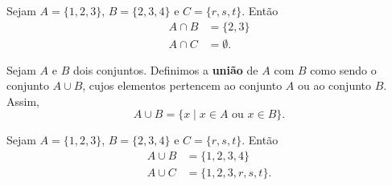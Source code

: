 \begin{exemplo}
	Sejam $A = \{1, 2, 3\}$, $B = \{2, 3, 4\}$ e $C = \{r, s, t\}$. Ent\~ao
	\begin{align*}
		A \cap B &= \{2, 3\}\\
		A \cap C &= \emptyset.
	\end{align*}
\end{exemplo}

\begin{definicao}\label{unicao_conjuntos}
	Sejam $A$ e $B$ dois conjuntos. Definimos a \textbf{uni{\~a}o} de $A$ com $B$ como sendo o conjunto $A \cup B$, cujos elementos pertencem ao conjunto $A$ ou ao conjunto $B$. Assim,
	\[
		A \cup B = \{x \mid x \in A \mbox{ ou } x \in B\}.
	\]

\end{definicao}

\begin{exemplo}
	Sejam $A = \{1, 2, 3\}$, $B = \{2, 3, 4\}$ e $C = \{r, s, t\}$. Ent\~ao
	\begin{align*}
		A \cup B &= \{1,2,3,4\}\\
		A \cup C &= \{1,2,3,r,s,t\}.
	\end{align*}
\end{exemplo}

